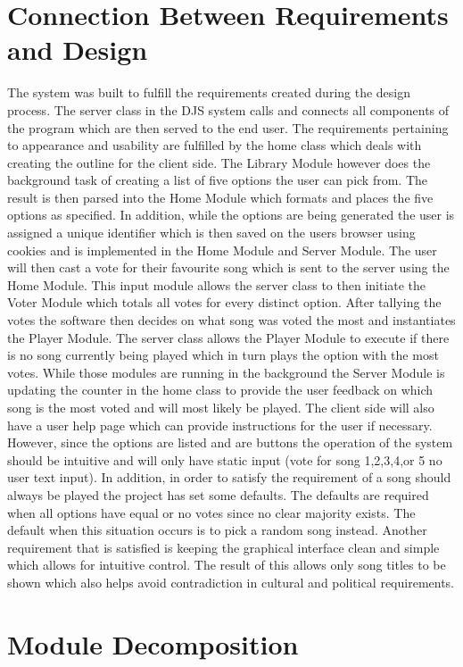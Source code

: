 \documentclass[12pt, titlepage]{article}
\begin{document}
\section{Connection Between Requirements and Design} \label{SecConnection}
The system was built to fulfill the requirements created during the design process. The server class in the DJS system calls and connects all components of the program which are then served to the end user. The requirements pertaining to appearance and usability are fulfilled by the home class which deals with creating the outline for the client side. The Library Module however does the background task of creating a list of five options the user can pick from. The result is then parsed into the Home Module which formats and places the five options as specified. In addition, while the options are being generated the user is assigned a unique identifier which is then saved on the users browser using cookies and is implemented in the Home Module and Server Module. The user will then cast a vote for their favourite song which is sent to the server using the Home Module. This input module allows the server class to then initiate the Voter Module which totals all votes for every distinct option. After tallying the votes the software then decides on what song was voted the most and instantiates the Player Module. The server class allows the Player Module to execute if there is no song currently being played which in turn plays the option with the most votes. While those modules are running in the background the Server Module is updating the counter in the home class to provide the user feedback on which song is the most voted and will most likely be played. The client side will also have a user help page which can provide instructions for the user if necessary. However, since the options are listed and are buttons the operation of the system should be intuitive and will only have static input (vote for song 1,2,3,4,or 5 no user text input). In addition, in order to satisfy the requirement of a song should always be played the project has set some defaults. The defaults are required when all options have equal or no votes since no clear majority exists. The default when this situation occurs is to pick a random song instead. Another requirement that is satisfied is keeping the graphical interface clean and simple which allows for intuitive control. The result of this allows only song titles to be shown which also helps avoid contradiction in cultural and political requirements.


\section{Module Decomposition} \label{SecMD}
\end{document}
